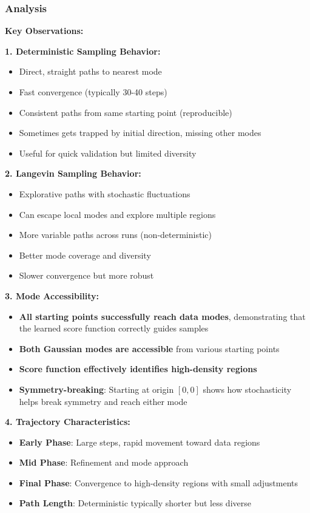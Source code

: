\documentclass[12pt,a4paper]{article}
\begin{document}
\subsubsection{Analysis}

\textbf{Key Observations:}

\textbf{1. Deterministic Sampling Behavior:}
\begin{itemize}
    \item Direct, straight paths to nearest mode
    \item Fast convergence (typically 30-40 steps)
    \item Consistent paths from same starting point (reproducible)
    \item Sometimes gets trapped by initial direction, missing other modes
    \item Useful for quick validation but limited diversity
\end{itemize}

\textbf{2. Langevin Sampling Behavior:}
\begin{itemize}
    \item Explorative paths with stochastic fluctuations
    \item Can escape local modes and explore multiple regions
    \item More variable paths across runs (non-deterministic)
    \item Better mode coverage and diversity
    \item Slower convergence but more robust
\end{itemize}

\textbf{3. Mode Accessibility:}
\begin{itemize}
    \item \textbf{All starting points successfully reach data modes}, demonstrating that the learned score function correctly guides samples
    \item \textbf{Both Gaussian modes are accessible} from various starting points
    \item \textbf{Score function effectively identifies high-density regions}
    \item \textbf{Symmetry-breaking}: Starting at origin $[0, 0]$ shows how stochasticity helps break symmetry and reach either mode
\end{itemize}

\textbf{4. Trajectory Characteristics:}
\begin{itemize}
    \item \textbf{Early Phase}: Large steps, rapid movement toward data regions
    \item \textbf{Mid Phase}: Refinement and mode approach
    \item \textbf{Final Phase}: Convergence to high-density regions with small adjustments
    \item \textbf{Path Length}: Deterministic typically shorter but less diverse
\end{itemize}
\end{document}
